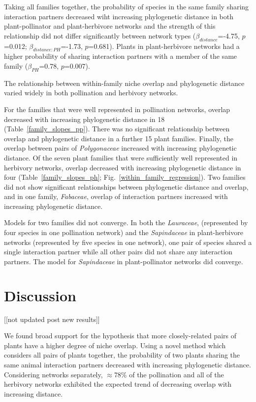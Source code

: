 \documentclass[12pt]{article}
\begin{document}
\begin{spacing}{1.5}
    Taking all families together, the probability of species in the same family sharing interaction partners decreased wiht increasing phylogenetic distance in both plant-pollinator and plant-herbivore networks and the strength of this relationship did not differ significantly between network types ($\beta_{distance}$=-4.75, $p$=0.012; $\beta_{distance:PH}$=-1.73, $p$=0.681). Plants in plant-herbivore networks had a higher probability of sharing interaction partners with a member of the same family ($\beta_{PH}$=0.78, $p$=0.007).


    The relationship between within-family niche overlap and phylogenetic distance
    varied widely in both pollination and herbivory networks. 


    For the families
    that were well represented in pollination networks, overlap decreased
    with increasing phylogenetic distance in 18 (Table~\ref{family_slopes_pp}).
    There was no significant relationship between overlap and phylogenetic distance in
    a further 15 plant families. Finally, the overlap between pairs of \emph{Polygonaceae}
    increased with increasing phylogenetic distance. 
    Of the seven plant families that were sufficiently well represented in herbivory 
    networks, overlap decreased with increasing phylogenetic distance in four 
    (Table~\ref{family_slopes_ph}; Fig.~\ref{within_family_regression}). Two
    families did not show significant relationships between phylogenetic distance and overlap,
    and in one family, \emph{Fabaceae}, overlap of interaction partners increased with 
    increasing phylogenetic distance.


    Models for two families did not converge. In both the \emph{Lauraceae}, (represented by four species in one pollination network) and the \emph{Sapindaceae} in plant-herbivore networks (represented by five species in one network), one pair of species shared a single interaction partner while all other pairs did not share any interaction partners. The model for \emph{Sapindaceae} in plant-pollinator networks did converge.


\section*{Discussion} [[not updated post new results]]

  We found broad support for the hypothesis that more
  closely-related pairs of plants have a higher degree
  of niche overlap. Using a novel method which considers
  all pairs of plants together, 
  the probability of two plants sharing the same animal 
  interaction partners decreased with increasing 
  phylogenetic distance. Considering networks separately,
  $\approx$78\%  of the pollination and all of the 
  herbivory networks exhibited the expected trend of decreasing 
  overlap with increasing distance. 



\end{spacing}
\end{document}
